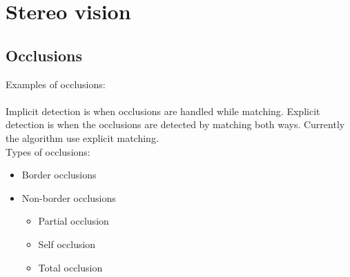 \chapter{Stereo vision}
\section{Occlusions}
Examples of occlusions:\\~\\

Implicit detection is when occlusions are handled while matching. Explicit detection is when the occlusions are detected by matching both ways. Currently the algorithm use explicit matching.  \\

Types of occlusions:
\begin{itemize}
  \item Border occlusions
  \item Non-border occlusions
  \begin{itemize}
    \item Partial occlusion
    \item Self occlusion
    \item Total occlusion
  \end{itemize}
\end{itemize}

